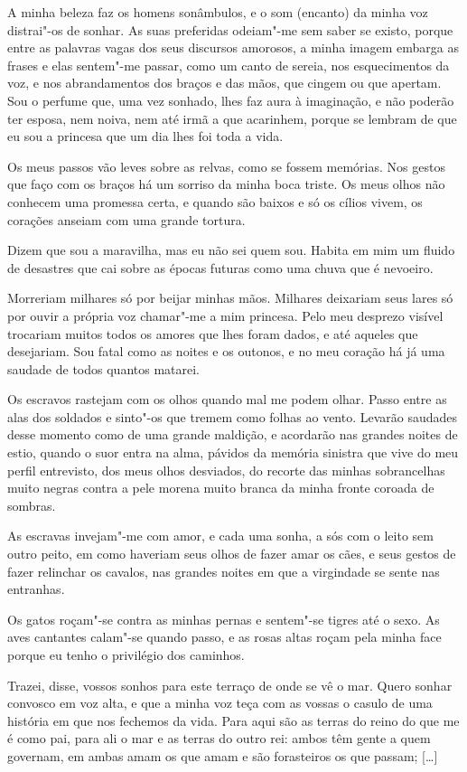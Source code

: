  A minha beleza faz os homens sonâmbulos, e o som (encanto)
da minha voz distrai"-os de sonhar. As suas preferidas odeiam"-me sem
saber se existo, porque entre as palavras vagas dos seus discursos
amorosos, a minha imagem embarga as frases e elas sentem"-me passar,
como um canto de sereia, nos esquecimentos da voz, e nos
abrandamentos dos braços e das mãos, que cingem ou que apertam. Sou o
perfume que, uma vez sonhado, lhes faz aura à imaginação, e não
poderão ter esposa, nem noiva, nem até irmã a que acarinhem, porque
se lembram de que eu sou a princesa que um dia lhes foi toda a vida. 

Os meus passos vão leves sobre as relvas, como se fossem memórias. Nos
gestos que faço com os braços há um sorriso da minha boca triste. Os
meus olhos não conhecem uma promessa certa, e quando são baixos e só
os cílios vivem, os corações anseiam com uma grande tortura. 

Dizem que sou a maravilha, mas eu não sei quem sou. Habita em mim um
fluido de desastres que cai sobre as épocas futuras como uma chuva
que é nevoeiro. 

Morreriam milhares só por beijar minhas mãos. Milhares deixariam seus
lares só por ouvir a própria voz chamar"-me a mim princesa. Pelo meu
desprezo visível trocariam muitos todos os amores que lhes foram
dados, e até aqueles que desejariam. Sou fatal como as noites e os
outonos, e no meu coração há já uma saudade de todos quantos matarei.


Os escravos rastejam com os olhos quando mal me podem olhar. Passo
entre as alas dos soldados e sinto"-os que tremem como folhas ao
vento. Levarão saudades desse momento como de uma grande maldição, e
acordarão nas grandes noites de estio, quando o suor entra na alma,
pávidos da memória sinistra que vive do meu perfil entrevisto, dos
meus olhos desviados, do recorte das minhas sobrancelhas muito negras
contra a pele morena muito branca da minha fronte coroada de sombras.

As escravas invejam"-me com amor, e cada uma sonha, a sós com o leito
sem outro peito, em como haveriam seus olhos de fazer amar os cães, e
seus gestos de fazer relinchar os cavalos, nas grandes noites em que
a virgindade se sente nas entranhas.

Os gatos roçam"-se contra as minhas pernas e sentem"-se tigres até o
sexo. As aves cantantes calam"-se quando passo, e as rosas altas roçam
pela minha face porque eu tenho o privilégio dos caminhos.

 Trazei, disse, vossos sonhos para este terraço de onde se
vê o mar. Quero sonhar convosco em voz alta, e que a minha voz teça
com as vossas o casulo de uma história em que nos fechemos da vida.
Para aqui são as terras do reino do que me é como pai, para ali o mar
e as terras do outro rei: ambos têm gente a quem governam, em ambas
amam os que amam e são forasteiros os que passam; [\ldots{}]

